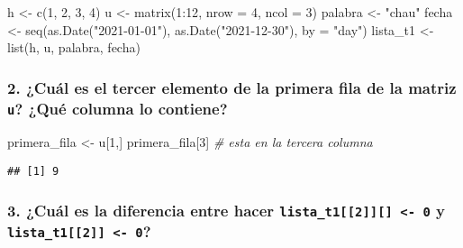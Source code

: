 \documentclass[
]{article}
\newenvironment{Shaded}{\begin{snugshade}}{\end{snugshade}}
\newcommand{\AttributeTok}[1]{\textcolor[rgb]{0.77,0.63,0.00}{#1}}
\newcommand{\CommentTok}[1]{\textcolor[rgb]{0.56,0.35,0.01}{\textit{#1}}}
\newcommand{\DecValTok}[1]{\textcolor[rgb]{0.00,0.00,0.81}{#1}}
\newcommand{\FunctionTok}[1]{\textcolor[rgb]{0.00,0.00,0.00}{#1}}
\newcommand{\NormalTok}[1]{#1}
\newcommand{\OtherTok}[1]{\textcolor[rgb]{0.56,0.35,0.01}{#1}}
\newcommand{\SpecialCharTok}[1]{\textcolor[rgb]{0.00,0.00,0.00}{#1}}
\newcommand{\StringTok}[1]{\textcolor[rgb]{0.31,0.60,0.02}{#1}}
\begin{document}
\begin{Shaded}
\begin{Highlighting}[]
\NormalTok{h }\OtherTok{\textless{}{-}} \FunctionTok{c}\NormalTok{(}\DecValTok{1}\NormalTok{, }\DecValTok{2}\NormalTok{, }\DecValTok{3}\NormalTok{, }\DecValTok{4}\NormalTok{)}
\NormalTok{u }\OtherTok{\textless{}{-}} \FunctionTok{matrix}\NormalTok{(}\DecValTok{1}\SpecialCharTok{:}\DecValTok{12}\NormalTok{, }\AttributeTok{nrow =} \DecValTok{4}\NormalTok{, }\AttributeTok{ncol =} \DecValTok{3}\NormalTok{)}
\NormalTok{palabra }\OtherTok{\textless{}{-}} \StringTok{"chau"}
\NormalTok{fecha }\OtherTok{\textless{}{-}} \FunctionTok{seq}\NormalTok{(}\FunctionTok{as.Date}\NormalTok{(}\StringTok{"2021{-}01{-}01"}\NormalTok{), }\FunctionTok{as.Date}\NormalTok{(}\StringTok{"2021{-}12{-}30"}\NormalTok{), }\AttributeTok{by =} \StringTok{"day"}\NormalTok{)}
\NormalTok{lista\_t1 }\OtherTok{\textless{}{-}} \FunctionTok{list}\NormalTok{(h, u, palabra, fecha)}
\end{Highlighting}
\end{Shaded}

\hypertarget{cuuxe1l-es-el-tercer-elemento-de-la-primera-fila-de-la-matriz-u-quuxe9-columna-lo-contiene}{%
\subsubsection{\texorpdfstring{2. ¿Cuál es el tercer elemento de la
primera fila de la matriz \texttt{u}? ¿Qué columna lo
contiene?}{2. ¿Cuál es el tercer elemento de la primera fila de la matriz u? ¿Qué columna lo contiene?}}\label{cuuxe1l-es-el-tercer-elemento-de-la-primera-fila-de-la-matriz-u-quuxe9-columna-lo-contiene}}

\begin{Shaded}
\begin{Highlighting}[]
\NormalTok{primera\_fila }\OtherTok{\textless{}{-}}\NormalTok{ u[}\DecValTok{1}\NormalTok{,]}
\NormalTok{primera\_fila[}\DecValTok{3}\NormalTok{] }\CommentTok{\# esta en la tercera columna}
\end{Highlighting}
\end{Shaded}

\begin{verbatim}
## [1] 9
\end{verbatim}

\hypertarget{cuuxe1l-es-la-diferencia-entre-hacer-lista_t12---0-y-lista_t12---0}{%
\subsubsection{\texorpdfstring{3. ¿Cuál es la diferencia entre hacer
\texttt{lista\_t1{[}{[}2{]}{]}{[}{]}\ \textless{}-\ 0} y
\texttt{lista\_t1{[}{[}2{]}{]}\ \textless{}-\ 0}?}{3. ¿Cuál es la diferencia entre hacer lista\_t1{[}{[}2{]}{]}{[}{]} \textless- 0 y lista\_t1{[}{[}2{]}{]} \textless- 0?}}\label{cuuxe1l-es-la-diferencia-entre-hacer-lista_t12---0-y-lista_t12---0}}
\end{document}
